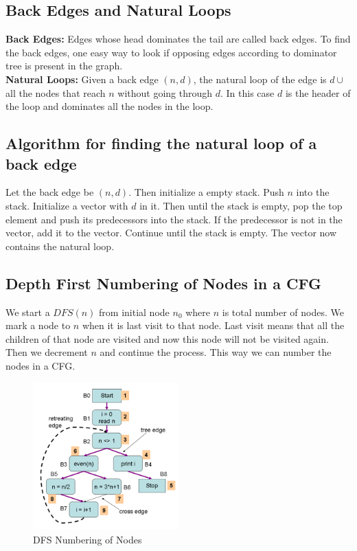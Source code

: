 \documentclass{article}
\begin{document}
\subsection*{Back Edges and Natural Loops}

\textbf{Back Edges: } Edges whose head dominates the tail are called back edges. To find the back edges, one easy way to look if opposing edges according to dominator tree is present in the graph. \\
\textbf{Natural Loops: } Given a back edge $(n,d)$, the natural loop of the edge is $d \cup $ all the nodes that reach $n$ without going through $d$. In this case $d$ is the header of the loop and dominates all the nodes in the loop.

\subsection*{Algorithm for finding the natural loop of a back edge} 
Let the back edge be $(n,d)$. Then initialize a empty stack. Push $n$ into the stack. Initialize a vector with $d$ in it. Then until the stack is empty, pop the top element and push its predecessors into the stack. If the predecessor is not in the vector, add it to the vector. Continue until the stack is empty. The vector now contains the natural loop.

\subsection*{Depth First Numbering of Nodes in a CFG}
We start a $DFS(n)$ from initial node $n_0$ where $n$ is total number of nodes. We mark a node to $n$ when it is last visit to that node. Last visit means that all the children of that node are visited and now this node will not be visited again. Then we decrement $n$ and continue the process. This way we can number the nodes in a CFG.

\begin{figure}[h]
    \centering
    \includegraphics[width=0.5\textwidth]{Images/dfs1.png}
    \caption{DFS Numbering of Nodes}
    \label{fig:cfg}
\end{figure}
\end{document}
